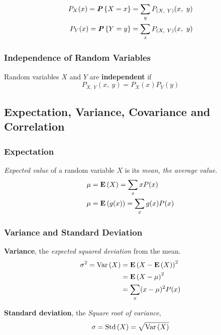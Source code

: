 \begin{multicols}{2}
\begin{align*}
  P_X(x) = \textbf{\textit{P}}\left\{X = x\right\} = \sum_y P_{(X,\ Y)} (x,\ y)\\
  P_Y(x) = \textbf{\textit{P}}\left\{Y = y\right\} = \sum_x P_{(X,\ Y)} (x,\ y)\\
\end{align*}

\subsubsection{Independence of Random Variables}

Random variables $X$ and $Y$ are \textbf{independent} if
\begin{equation*}
  P_{X,\ Y}(x,\ y) = P_X(x) P_Y(y)
\end{equation*}


\subsection{Expectation, Variance, Covariance and Correlation}

\subsubsection{Expectation}

\textit{Expected value} of a random variable $X$ is its \textit{mean, the average value}.
\begin{align*}
  \mu &= \mathbf{E}\left(X\right) = \sum_x xP(x)\\
  \mu &= \mathbf{E}\left(g(x)\right) = \sum_x g(x)P(x)
\end{align*}

\subsubsection{Variance and Standard Deviation}

\textbf{Variance}, the \textit{expected squared deviation} from the mean.
  \begin{align*}
    \sigma^2 = \text{Var}\left( X \right) &= \mathbf{E}\left(X - \mathbf{E}\left(X\right)\right)^2\\
                      &= \mathbf{E}\left(X - \mu\right)^2\\
                      &= \sum_{x} (x - \mu)^2 P(x) 
  \end{align*}

\noindent \textbf{Standard deviation}, the \textit{Square root of variance},
  \begin{equation*}
      \sigma = \text{Std}\left( X \right) = \sqrt{\text{Var}\left( X \right)}
  \end{equation*}


\end{multicols}

